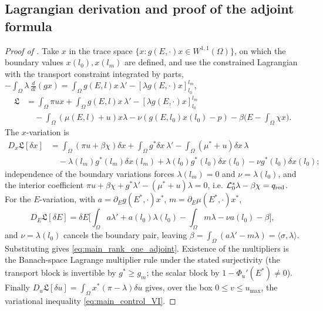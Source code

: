 \documentclass[a4paper,fleqn,longmktitle]{cas-sc}
\theoremstyle{plain}
\theoremstyle{definition}
\theoremstyle{remark}
\numberwithin{equation}{section}
\begin{document}
\subsection{Lagrangian derivation and proof of the adjoint formula}
\label{subsec:proof_adjoint}
\begin{proof}[Proof of ]
Take \(x\) in the trace space \(\{x:g(E,\cdot)x\in W^{1,1}(\Omega)\}\), on which
the boundary values \(x(l_0),x(l_m)\) are defined, and use the constrained
Lagrangian with the transport constraint integrated by parts,
\(-\int_\Omega\lambda\,\tfrac{d}{dl}(gx)
=\int_\Omega g(E,l)x\,\lambda'-[\lambda g(E,\cdot)x]_{l_0}^{l_m}\),
\[
\begin{aligned}
    \mathfrak L
    &=
    \int_\Omega \pi ux
    +
    \int_\Omega g(E,l)x\,\lambda'
    -
    [\lambda g(E,\cdot)x]_{l_0}^{l_m}
    \\
    &\quad
    -
    \int_\Omega(\mu(E,l)+u)x\lambda
    -
    \nu(g(E,l_0)x(l_0)-p)
    -
    \beta\Big(E-\int_\Omega\chi x\Big).
\end{aligned}
\]
The \(x\)-variation is
\[
\begin{aligned}
    D_x\mathfrak L[\delta x]
    &=
    \int_\Omega(\pi u+\beta\chi)\delta x
    +
    \int_\Omega g^*\delta x\,\lambda'
    -
    \int_\Omega(\mu^*+u)\delta x\,\lambda
    \\
    &\quad
    -
    \lambda(l_m)g^*(l_m)\delta x(l_m)
    +
    \lambda(l_0)g^*(l_0)\delta x(l_0)
    -
    \nu g^*(l_0)\delta x(l_0);
\end{aligned}
\]
independence of the boundary variations forces \(\lambda(l_m)=0\) and
\(\nu=\lambda(l_0)\), and the interior coefficient
\(\pi u+\beta\chi+g^*\lambda'-(\mu^*+u)\lambda=0\), i.e.
\(\mathcal L_0^*\lambda-\beta\chi=q_{\rm red}\). For the \(E\)-variation, with
\(a=\partial_Eg(E^*,\cdot)x^*\), \(m=\partial_E\mu(E^*,\cdot)x^*\),
\[
    D_E\mathfrak L[\delta E]
    =
    \delta E
    \Big[
        \int_\Omega a\lambda'
        +
        a(l_0)\lambda(l_0)
        -
        \int_\Omega m\lambda
        -
        \nu a(l_0)
        -
        \beta
    \Big],
\]
and \(\nu=\lambda(l_0)\) cancels the boundary pair, leaving
\(\beta=\int_\Omega(a\lambda'-m\lambda)=\langle\sigma,\lambda\rangle\).
Substituting gives \eqref{eq:main_rank_one_adjoint}. Existence of the
multipliers is the Banach-space Lagrange multiplier rule under the stated
surjectivity (the transport block is invertible by \(g^*\ge g_m\); the scalar
block by \(1-\Phi_u'(E^*)\ne0\)). Finally
\(D_u\mathfrak L[\delta u]=\int_\Omega x^*(\pi-\lambda)\delta u\) gives, over the
box \(0\le v\le u_{\max}\), the variational inequality
\eqref{eq:main_control_VI}.
\end{proof}
\end{document}

